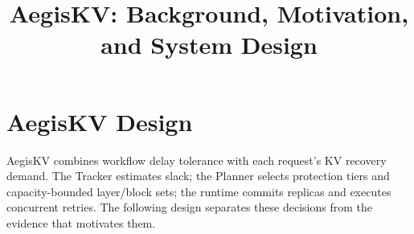 \documentclass[sigplan,10pt,anonymous,nonacm]{acmart}
\title{AegisKV: Background, Motivation, and System Design}
\begin{document}
\pagestyle{aegispreview}
\maketitle
\thispagestyle{aegispreview}
\raggedbottom
\setcounter{section}{1}

\section{AegisKV Design}
\label{sec:design}

AegisKV combines workflow delay tolerance with each request's KV
recovery demand. The Tracker estimates slack; the Planner selects
protection tiers and capacity-bounded layer/block sets; the runtime
commits replicas and executes concurrent retries. The following design
separates these decisions from the evidence that motivates them.











\end{document}
